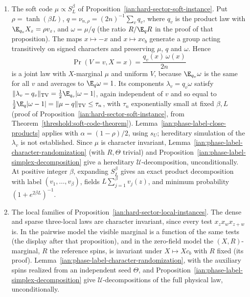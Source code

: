 \begin{enumerate}
\item The soft code \(\mu\propto S_L^\beta\) of
Proposition~\ref{ian:hard-sector-soft-instance}. Put \(\rho=\tanh(\beta L)\),
\(q=\nu_{n,\rho}=(2n)^{-1}\sum_vq_v\), where \(q_v\) is the product law
with \(\E_{q_v}X_z=\rho v_z\), and \(\omega=\mu/q\) (the ratio
\(R/\E_qR\) in the proof of that proposition). The maps \(x\mapsto-x\)
and \(x\mapsto xc_b\) generate a group acting transitively on signed
characters and preserving \(\mu\), \(q\) and \(\omega\). Hence
\[
 \Pr(V=v,X=x)=\frac{q_v(x)\,\omega(x)}{2n}
 \tag{19.8}\label{ian:phase-label-soft-joint}
\]
is a joint law with \(X\)-marginal \(\mu\) and uniform \(V\), because
\(\E_{q_v}\omega\) is the same for all \(v\) and averages to
\(\E_q\omega=1\). Its components \(\lambda_v=q_v\omega\) satisfy
\(\|\lambda_v-q_v\|_{\rm TV}=\frac12\E_{q_v}|\omega-1|\), again
independent of \(v\) and so equal to
\(\frac12\E_q|\omega-1|=\|\mu-q\|_{\rm TV}\le\tau_n\), with \(\tau_n\)
exponentially small at fixed \(\beta,L\) (proof of
Proposition~\ref{ian:hard-sector-soft-instance}, from
Theorem~\ref{threshold:soft-code-theorem}). Lemma~\ref{ian:phase-label-close-products}
applies with \(\alpha=(1-\rho)/2\), using \(s_U\); hereditary
simulation of the \(\lambda_v\) is not established.
Since \(\mu\) is character invariant,
Lemma~\ref{ian:phase-label-character-randomization} (with \(R,\Theta\)
trivial) and Proposition~\ref{ian:phase-label-simplex-decomposition} give
a hereditary \(\mathcal U\)-decomposition, unconditionally. At positive
integer \(\beta\), expanding \(S_L^\beta\) gives an exact product
decomposition with label \((v_1,\ldots,v_\beta)\), fields
\(L\sum_{j=1}^\beta v_j(z)\), and minimum probability
\((1+e^{2\beta L})^{-1}\).

\item The local families of
Proposition~\ref{ian:hard-sector-local-instances}. The dense and sparse
three-local laws are character invariant, since every test
\(x_zx_wx_{z+w}\) is. In the pairwise model the visible marginal is a
function of the same tests (the display after that proposition), and in
the zero-field model the \((X,R)\)-marginal, \(R\) the reference spins,
is invariant under \(X\mapsto Xc_b\) with \(R\) fixed (its proof).
Lemma~\ref{ian:phase-label-character-randomization}, with the auxiliary
spins realized from an independent seed \(\Theta\), and
Proposition~\ref{ian:phase-label-simplex-decomposition} give
\(\mathcal U\)-decompositions of the full physical law, unconditionally.


\end{enumerate}
